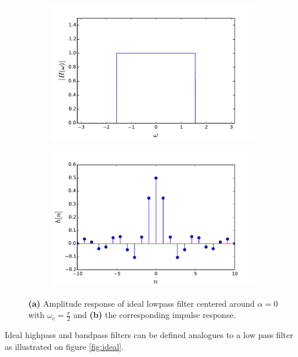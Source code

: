 \begin{figure}[H]
\begin{subfigure}[b]{0.50\textwidth}
        \centering
\includegraphics[scale=0.45]{figures/filter_teori/ideal_low2.pdf}
\caption{}
\end{subfigure}
\begin{subfigure}[b]{0.50\textwidth}
        \centering  
\includegraphics[scale=0.45]{figures/filter_teori/ideal_low1.pdf}
\caption{}
 \end{subfigure}
\caption{\textbf{(a)} Amplitude response of ideal lowpass filter centered around $\alpha=0$ with $\omega_c = \frac{\pi}{2}$ and \textbf{(b)} the corresponding impulse response.}
\label{fig:ideal_low}
\end{figure}

Ideal highpass and bandpass filters can be defined analogues to a low pass filter as illustrated on figure \ref{fig:ideal}.


